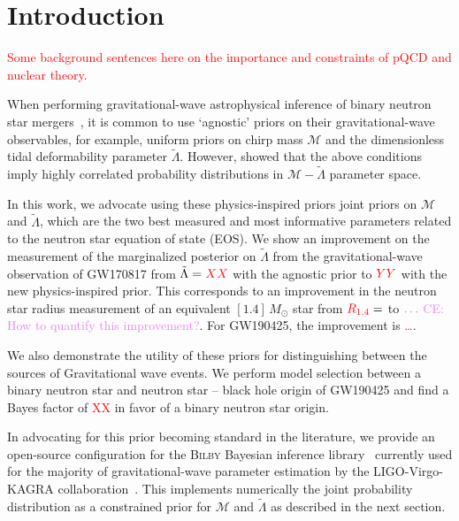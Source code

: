 \documentclass[twocolumn]{aastex631}
\newcommand{\red}[1]{\textcolor{red}{#1}}
\newcommand{\CE}[1]{\textcolor{violet}{CE: #1}}
\begin{document}
		
\section{Introduction} \label{sec:Intro}
	
\red{Some background sentences here on the  importance and constraints of pQCD and nuclear theory.}

When performing gravitational-wave astrophysical inference of binary neutron star mergers~\citep[e.g.,][]{abbott17_170817observation,abbott18_170817EOS,abbott19_170817Properties,abbott20_190425}, it is common to use `agnostic' priors on their gravitational-wave observables, for example, uniform priors on chirp mass $\mathcal{M}$ and the dimensionless tidal deformability parameter $\tilde{\Lambda}$. 
However, \citet{altiparmak22,Ecker:2022dlg} showed that the above conditions imply highly correlated probability distributions in $\mathcal{M}-\tilde{\Lambda}$ parameter space.
 	
In this work, we advocate using these physics-inspired priors joint priors on $\mathcal{M}$ and $\tilde{\Lambda}$, which are the two best measured and most informative parameters related to the neutron star equation of state (EOS).
We show an improvement on the measurement of the marginalized posterior on $\tilde{\Lambda}$ from the gravitational-wave observation of GW170817 from $\tilde{\Lambda}=\red{XX}$ with the agnostic prior to $\red{YY}$ with the new physics-inspired prior.
This corresponds to an improvement in the neutron star radius measurement of an equivalent $[1.4]\,{M_\odot}$ star from $\red{R_{1.4}}= $ to $\red{\ldots}$ \CE{How to quantify this improvement?}.
For GW190425, the improvement is \red{\ldots}.
	
We also demonstrate the utility of these priors for distinguishing between the sources of Gravitational wave events. 
We perform model selection between a binary neutron star and neutron star -- black hole origin of GW190425 and find a Bayes factor of \red{XX} in favor of a binary neutron star origin. 
	
In advocating for this prior becoming standard in the literature, we provide an open-source configuration for the \textsc{Bilby} Bayesian inference library~\citep{ashton19,romeroshaw20} currently used for the majority of gravitational-wave parameter estimation by the LIGO-Virgo-KAGRA collaboration~\citep{LIGO, Virgo, KAGRA}.
This implements numerically the joint probability distribution as a constrained prior for $\mathcal{M}$ and $\tilde{\Lambda}$ as described in the next section.
	
\end{document}
